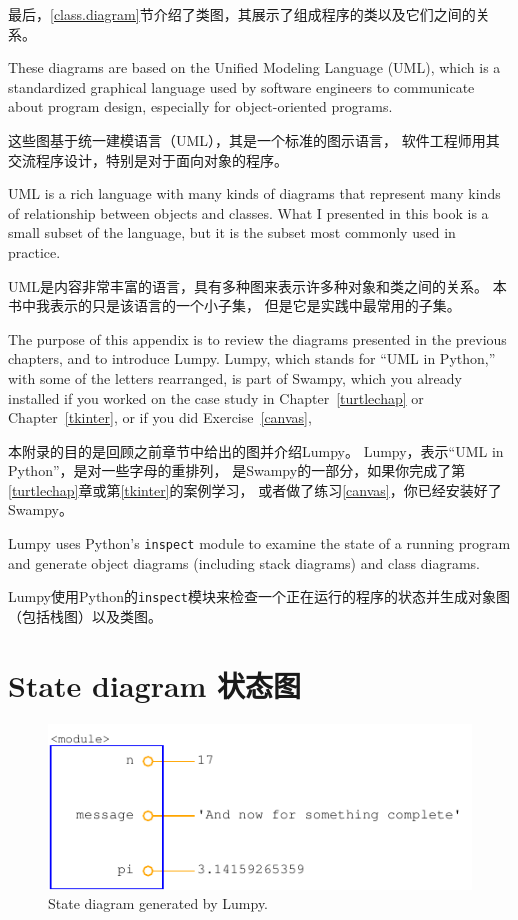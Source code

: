\documentclass[10pt]{book}
\begin{document}
\begin{CJK}{UTF8}{gbsn}
最后，\ref{class.diagram}节介绍了类图，其展示了组成程序的类以及它们之间的关系。

These diagrams are based on the Unified Modeling Language (UML), which
is a standardized graphical language used by software engineers
to communicate about program design, especially for object-oriented
programs.

这些图基于统一建模语言（UML），其是一个标准的图示语言，
软件工程师用其交流程序设计，特别是对于面向对象的程序。

UML is a rich language with many kinds of diagrams that represent
many kinds of relationship between objects and classes.  What I presented
in this book is a small subset of the language, but it is the subset
most commonly used in practice.

UML是内容非常丰富的语言，具有多种图来表示许多种对象和类之间的关系。
本书中我表示的只是该语言的一个小子集，
但是它是实践中最常用的子集。

The purpose of this appendix is to review the diagrams presented in
the previous chapters, and to introduce Lumpy.  Lumpy, which stands
for ``UML in Python,'' with some of the letters rearranged, is part of
Swampy, which you already installed if you worked on the case study in
Chapter~\ref{turtlechap} or Chapter~\ref{tkinter}, or if you did
Exercise~\ref{canvas},

本附录的目的是回顾之前章节中给出的图并介绍Lumpy。
Lumpy，表示``UML in Python''，是对一些字母的重排列，
是Swampy的一部分，如果你完成了第\ref{turtlechap}章或第\ref{tkinter}的案例学习，
或者做了练习\ref{canvas}，你已经安装好了Swampy。

Lumpy uses Python's {\tt inspect} module to examine the state of a running
program and generate object diagrams (including stack diagrams) and
class diagrams.

Lumpy使用Python的{\tt inspect}模块来检查一个正在运行的程序的状态并生成对象图
（包括栈图）以及类图。

\section{State diagram 状态图}

\begin{figure}
\centerline
{\includegraphics[scale=0.7]{figs/lumpydemo1.pdf}}
\caption{State diagram generated by Lumpy.}
\label{fig.lumpy1}
\end{figure}


\end{CJK}
\end{document}
